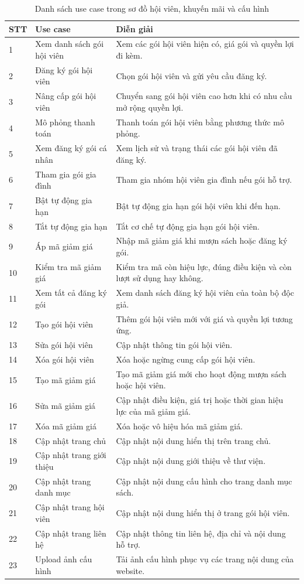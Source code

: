 \documentclass[../main.tex]{subfiles}
\begin{document}
\begin{longtable}{|p{1cm}|p{4cm}|p{8cm}|}
\caption{Danh sách use case trong sơ đồ hội viên, khuyến mãi và cấu hình}\\
\hline
\textbf{STT} & \textbf{Use case} & \textbf{Diễn giải} \\
\hline
1 & Xem danh sách gói hội viên & Xem các gói hội viên hiện có, giá gói và quyền lợi đi kèm. \\
\hline
2 & Đăng ký gói hội viên & Chọn gói hội viên và gửi yêu cầu đăng ký. \\
\hline
3 & Nâng cấp gói hội viên & Chuyển sang gói hội viên cao hơn khi có nhu cầu mở rộng quyền lợi. \\
\hline
4 & Mô phỏng thanh toán & Thanh toán gói hội viên bằng phương thức mô phỏng. \\
\hline
5 & Xem đăng ký gói cá nhân & Xem lịch sử và trạng thái các gói hội viên đã đăng ký. \\
\hline
6 & Tham gia gói gia đình & Tham gia nhóm hội viên gia đình nếu gói hỗ trợ. \\
\hline
7 & Bật tự động gia hạn & Bật tự động gia hạn gói hội viên khi đến hạn. \\
\hline
8 & Tắt tự động gia hạn & Tắt cơ chế tự động gia hạn gói hội viên. \\
\hline
9 & Áp mã giảm giá & Nhập mã giảm giá khi mượn sách hoặc đăng ký gói. \\
\hline
10 & Kiểm tra mã giảm giá & Kiểm tra mã còn hiệu lực, đúng điều kiện và còn lượt sử dụng hay không. \\
\hline
11 & Xem tất cả đăng ký gói & Xem danh sách đăng ký hội viên của toàn bộ độc giả. \\
\hline
12 & Tạo gói hội viên & Thêm gói hội viên mới với giá và quyền lợi tương ứng. \\
\hline
13 & Sửa gói hội viên & Cập nhật thông tin gói hội viên. \\
\hline
14 & Xóa gói hội viên & Xóa hoặc ngừng cung cấp gói hội viên. \\
\hline
15 & Tạo mã giảm giá & Tạo mã giảm giá mới cho hoạt động mượn sách hoặc hội viên. \\
\hline
16 & Sửa mã giảm giá & Cập nhật điều kiện, giá trị hoặc thời gian hiệu lực của mã giảm giá. \\
\hline
17 & Xóa mã giảm giá & Xóa hoặc vô hiệu hóa mã giảm giá. \\
\hline
18 & Cập nhật trang chủ & Cập nhật nội dung hiển thị trên trang chủ. \\
\hline
19 & Cập nhật trang giới thiệu & Cập nhật nội dung giới thiệu về thư viện. \\
\hline
20 & Cập nhật trang danh mục & Cập nhật nội dung cấu hình cho trang danh mục sách. \\
\hline
21 & Cập nhật trang hội viên & Cập nhật nội dung hiển thị ở trang gói hội viên. \\
\hline
22 & Cập nhật trang liên hệ & Cập nhật thông tin liên hệ, địa chỉ và nội dung hỗ trợ. \\
\hline
23 & Upload ảnh cấu hình & Tải ảnh cấu hình phục vụ các trang nội dung của website. \\
\hline
\end{longtable}
\end{document}
